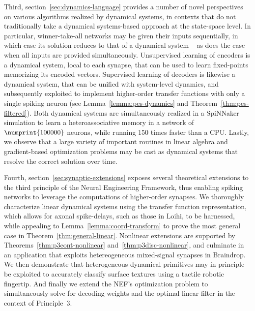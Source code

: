 Third, section~\ref{sec:dynamics-language} provides a number of novel perspectives on various algorithms realized by dynamical systems, in contexts that do not traditionally take a dynamical systems-based approach at the state-space level.
In particular, winner-take-all networks may be given their inputs sequentially, in which case its solution reduces to that of a dynamical system -- as does the case when all inputs are provided simultaneously.
Unsupervised learning of encoders is a dynamical system, local to each synapse, that can be used to learn fixed-points memorizing its encoded vectors. 
Supervised learning of decoders is likewise a dynamical system, that can be unified with system-level dynamics, and subsequently exploited to implement higher-order transfer functions with only a single spiking neuron (see Lemma~\ref{lemma:pes-dynamics} and Theorem~\ref{thm:pes-filtered}).
Both dynamical systems are simultaneously realized in a SpiNNaker simulation to learn a heteroassociative memory in a network of $\numprint{100000}$ neurons, while running $150$ times faster than a CPU.
Lastly, we observe that a large variety of important routines in linear algebra and gradient-based optimization problems may be cast as dynamical systems that resolve the correct solution over time.

Fourth, section~\ref{sec:synaptic-extensions} exposes several theoretical extensions to the third principle of the Neural Engineering Framework, thus enabling spiking networks to leverage the computations of higher-order synapses.
We thoroughly characterize linear dynamical systems using the transfer function representation, which allows for axonal spike-delays, such as those in Loihi, to be harnessed, while appealing to Lemma~\ref{lemma:coord-transform} to prove the most general case in Theorem~\ref{thm:general-linear}.
Nonlinear extensions are supported by Theorems~\ref{thm:p3cont-nonlinear} and~\ref{thm:p3disc-nonlinear}, and culminate in an application that exploits hetereogeneous mixed-signal synapses in Braindrop.
We then demonstrate that heterogeneous dynamical primitives may in principle be exploited to accurately classify surface textures using a tactile robotic fingertip.
And finally we extend the NEF's optimization problem to simultaneously solve for decoding weights and the optimal linear filter in the context of Principle~3.

